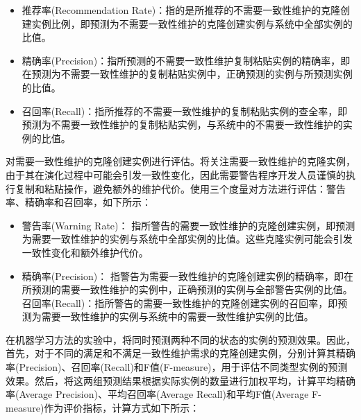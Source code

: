 \begin{itemize}
\item	
推荐率(Recommendation Rate)：指的是所推荐的不需要一致性维护的克隆创建实例比例，即预测为不需要一致性维护的克隆创建实例与系统中全部实例的比值。
\item  
精确率(Precision)：指所预测的不需要一致性维护复制粘贴实例的精确率，即在预测为不需要一致性维护的复制粘贴实例中，正确预测的实例与所预测实例的比值。
\item  
召回率(Recall)：指所推荐的不需要一致性维护的复制粘贴实例的查全率，即预测为不需要一致性维护的复制粘贴实例，与系统中的不需要一致性维护的实例的比值。
\end{itemize}

对需要一致性维护的克隆创建实例进行评估。将关注需要一致性维护的克隆实例，由于其在演化过程中可能会引发一致性变化，因此需要警告程序开发人员谨慎的执行复制和粘贴操作，避免额外的维护代价。使用三个度量对方法进行评估：警告率、精确率和召回率，如下所示：
\begin{itemize}
\item	
警告率(Warning Rate)：
指所警告的需要一致性维护的克隆创建实例，即预测为需要一致性维护的实例与系统中全部实例的比值。这些克隆实例可能会引发一致性变化和额外维护代价。

\item	
精确率(Precision)：
指警告为需要一致性维护的克隆创建实例的精确率，即在所预测的需要一致性维护的实例中，正确预测的实例与全部警告实例的比值。
召回率(Recall)：指所警告的需要一致性维护的克隆创建实例的召回率，即预测为需要一致性维护的实例与系统中的需要一致性维护实例的比值。
\end{itemize}

在机器学习方法的实验中，将同时预测两种不同的状态的实例的预测效果。因此，首先，对于不同的满足和不满足一致性维护需求的克隆创建实例，分别计算其精确率(Precision)、召回率(Recall)和F值(F-measure)，用于评估不同类型实例的预测效果。然后，将这两组预测结果根据实际实例的数量进行加权平均，计算平均精确率(Average Precision)、平均召回率(Average Recall)和平均F值(Average F-measure)作为评价指标，计算方式如下所示：

